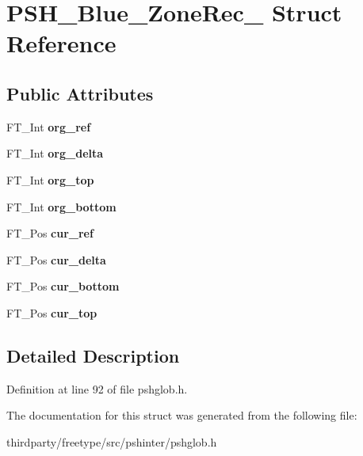 \hypertarget{struct_p_s_h___blue___zone_rec__}{}\section{P\+S\+H\+\_\+\+Blue\+\_\+\+Zone\+Rec\+\_\+ Struct Reference}
\label{struct_p_s_h___blue___zone_rec__}
\subsection*{Public Attributes}
\begin{DoxyCompactItemize}
\item 
\mbox{\label{struct_p_s_h___blue___zone_rec___ad6c98c1b6398f757725cc8d900339ee9}} 
F\+T\+\_\+\+Int {\bfseries org\+\_\+ref}
\item 
\mbox{\label{struct_p_s_h___blue___zone_rec___a4bf88ac8d5d5fea2946686e57e3e6d75}} 
F\+T\+\_\+\+Int {\bfseries org\+\_\+delta}
\item 
\mbox{\label{struct_p_s_h___blue___zone_rec___a62dac7f5e8d472ea47a1a9ec962f4b01}} 
F\+T\+\_\+\+Int {\bfseries org\+\_\+top}
\item 
\mbox{\label{struct_p_s_h___blue___zone_rec___af09f51397360e614f909802e5fa29575}} 
F\+T\+\_\+\+Int {\bfseries org\+\_\+bottom}
\item 
\mbox{\label{struct_p_s_h___blue___zone_rec___a7801228789920539914ef05fda7f0c6c}} 
F\+T\+\_\+\+Pos {\bfseries cur\+\_\+ref}
\item 
\mbox{\label{struct_p_s_h___blue___zone_rec___a73b836869930f314651dfd42a42ddfcc}} 
F\+T\+\_\+\+Pos {\bfseries cur\+\_\+delta}
\item 
\mbox{\label{struct_p_s_h___blue___zone_rec___a0aefe85c9fe5aed2ff60b5e7f204ca9b}} 
F\+T\+\_\+\+Pos {\bfseries cur\+\_\+bottom}
\item 
\mbox{\label{struct_p_s_h___blue___zone_rec___a24412f1d3e29e588387b65912a4f948c}} 
F\+T\+\_\+\+Pos {\bfseries cur\+\_\+top}
\end{DoxyCompactItemize}


\subsection{Detailed Description}


Definition at line 92 of file pshglob.\+h.



The documentation for this struct was generated from the following file\+:\begin{DoxyCompactItemize}
\item 
thirdparty/freetype/src/pshinter/pshglob.\+h\end{DoxyCompactItemize}
